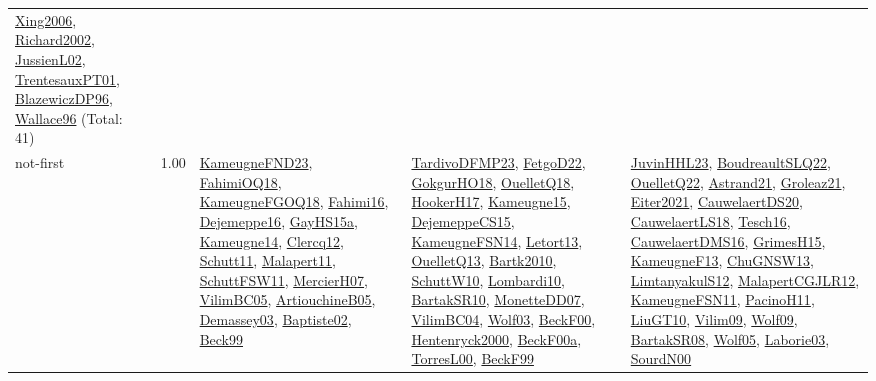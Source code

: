 {\begin{longtable}{p{3cm}r>{\raggedright\arraybackslash}p{6cm}>{\raggedright\arraybackslash}p{6cm}>{\raggedright\arraybackslash}p{8cm}}
\hyperref[detail:Xing2006]{Xing2006}, \hyperref[detail:Richard2002]{Richard2002}, \hyperref[detail:JussienL02]{JussienL02}, \hyperref[detail:TrentesauxPT01]{TrentesauxPT01}, \hyperref[detail:BlazewiczDP96]{BlazewiczDP96}, \hyperref[detail:Wallace96]{Wallace96} (Total: 41)\\
\index{not-first}\index{Algorithms!not-first}not-first &  1.00 & \hyperref[detail:KameugneFND23]{KameugneFND23}, \hyperref[detail:FahimiOQ18]{FahimiOQ18}, \hyperref[detail:KameugneFGOQ18]{KameugneFGOQ18}, \hyperref[detail:Fahimi16]{Fahimi16}, \hyperref[detail:Dejemeppe16]{Dejemeppe16}, \hyperref[detail:GayHS15a]{GayHS15a}, \hyperref[detail:Kameugne14]{Kameugne14}, \hyperref[detail:Clercq12]{Clercq12}, \hyperref[detail:Schutt11]{Schutt11}, \hyperref[detail:Malapert11]{Malapert11}, \hyperref[detail:SchuttFSW11]{SchuttFSW11}, \hyperref[detail:MercierH07]{MercierH07}, \hyperref[detail:VilimBC05]{VilimBC05}, \hyperref[detail:ArtiouchineB05]{ArtiouchineB05}, \hyperref[detail:Demassey03]{Demassey03}, \hyperref[detail:Baptiste02]{Baptiste02}, \hyperref[detail:Beck99]{Beck99} & \hyperref[detail:TardivoDFMP23]{TardivoDFMP23}, \hyperref[detail:FetgoD22]{FetgoD22}, \hyperref[detail:GokgurHO18]{GokgurHO18}, \hyperref[detail:OuelletQ18]{OuelletQ18}, \hyperref[detail:HookerH17]{HookerH17}, \hyperref[detail:Kameugne15]{Kameugne15}, \hyperref[detail:DejemeppeCS15]{DejemeppeCS15}, \hyperref[detail:KameugneFSN14]{KameugneFSN14}, \hyperref[detail:Letort13]{Letort13}, \hyperref[detail:OuelletQ13]{OuelletQ13}, \hyperref[detail:Bartk2010]{Bartk2010}, \hyperref[detail:SchuttW10]{SchuttW10}, \hyperref[detail:Lombardi10]{Lombardi10}, \hyperref[detail:BartakSR10]{BartakSR10}, \hyperref[detail:MonetteDD07]{MonetteDD07}, \hyperref[detail:VilimBC04]{VilimBC04}, \hyperref[detail:Wolf03]{Wolf03}, \hyperref[detail:BeckF00]{BeckF00}, \hyperref[detail:Hentenryck2000]{Hentenryck2000}, \hyperref[detail:BeckF00a]{BeckF00a}, \hyperref[detail:TorresL00]{TorresL00}, \hyperref[detail:BeckF99]{BeckF99} & \hyperref[detail:JuvinHHL23]{JuvinHHL23}, \hyperref[detail:BoudreaultSLQ22]{BoudreaultSLQ22}, \hyperref[detail:OuelletQ22]{OuelletQ22}, \hyperref[detail:Astrand21]{Astrand21}, \hyperref[detail:Groleaz21]{Groleaz21}, \hyperref[detail:Eiter2021]{Eiter2021}, \hyperref[detail:CauwelaertDS20]{CauwelaertDS20}, \hyperref[detail:CauwelaertLS18]{CauwelaertLS18}, \hyperref[detail:Tesch16]{Tesch16}, \hyperref[detail:CauwelaertDMS16]{CauwelaertDMS16}, \hyperref[detail:GrimesH15]{GrimesH15}, \hyperref[detail:KameugneF13]{KameugneF13}, \hyperref[detail:ChuGNSW13]{ChuGNSW13}, \hyperref[detail:LimtanyakulS12]{LimtanyakulS12}, \hyperref[detail:MalapertCGJLR12]{MalapertCGJLR12}, \hyperref[detail:KameugneFSN11]{KameugneFSN11}, \hyperref[detail:PacinoH11]{PacinoH11}, \hyperref[detail:LiuGT10]{LiuGT10}, \hyperref[detail:Vilim09]{Vilim09}, \hyperref[detail:Wolf09]{Wolf09}, \hyperref[detail:BartakSR08]{BartakSR08}, \hyperref[detail:Wolf05]{Wolf05}, \hyperref[detail:Laborie03]{Laborie03}, \hyperref[detail:SourdN00]{SourdN00}\\

\end{longtable}}
